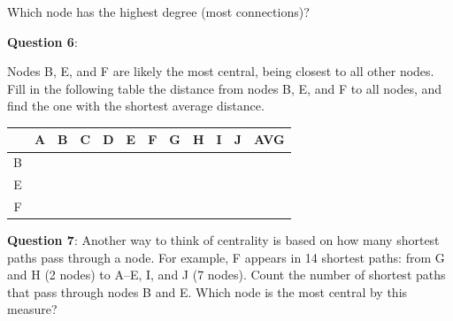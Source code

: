 \documentclass[a4paper, 14pt]{extarticle}
\begin{document}
\begin{center}
\end{center}

Which node has the highest degree (most connections)?


{\bf Question 6}:

Nodes B, E, and F are likely the most central, being closest to all other nodes. Fill in the following table the distance from nodes B, E, and F to all nodes, and find the one with the shortest average distance.

\begin{center}
\begin{tabular}{|c|p{1cm}|p{1cm}|p{1cm}|p{1cm}|p{1cm}|p{1cm}|p{1cm}|p{1cm}|p{1cm}|p{1cm}|p{1cm}|}
\hline
& A & B & C & D & E & F & G & H & I & J & AVG \\
\hline
B & & & & & & & & & & & \\[0.5cm]
\hline
E & & & & & & & & & & & \\[0.5cm]
\hline
F & & & & & & & & & & & \\[0.5cm]
\hline
\end{tabular}
\end{center}

\clearpage

{\bf Question 7}:
Another way to think of centrality is based on how many shortest paths pass through a node.
For example, F appears in 14 shortest paths: from G and H (2 nodes) to A--E, I, and J (7 nodes).
Count the number of shortest paths that pass through nodes B and E. Which node is the most central by this measure?
\end{document}
